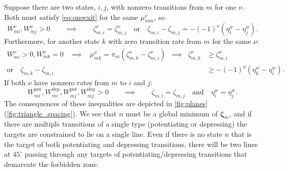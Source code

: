 \documentclass[12pt]{article}
\newcommand{\eqm}{\pi}
\newcommand{\etwm}{\eta^w}
\newcommand{\dgnm}{\zeta}
\newcommand{\dgn}{\boldsymbol{\dgnm}}
\newcommand{\Wm}{W}
\newcommand{\kktm}{\mu}
\newcommand{\pot}{^{\text{pot}}}
\newcommand{\dep}{^{\text{dep}}}
\begin{document}
Suppose there are two states, \(i,j\), with nonzero transitions from \(m\) for one \(\nu\).
Both must satisfy \cref{eq:oneexit} for the same \(\kktm^\nu_{mm}\), so
%
\begin{equation}\label{eq:twoexits}
  \Wm^\nu_{mi}, \Wm^\nu_{mj} > 0
  \qquad \implies \qquad
  \dgnm^\nu_{m,i} = \dgnm^\nu_{m,j}
  \quad \text{or}\quad
  \dgnm_{m,i} - \dgnm_{m,j} = - (-1)^\nu (\etwm_i - \etwm_j).
\end{equation}
%
Furthermore, for another state \(k\) with zero transition rate from \(m\) for the same \(\nu\):
%
\begin{equation}\label{eq:nonexit}
\begin{aligned}
  \Wm^\nu_{mi} > 0, \Wm^\nu_{mk} = 0 
  \;\;\; \implies \;\;\;
  \kktm^\nu_{mk} = \eqm_m (\dgnm^\nu_{m,k} - \dgnm^\nu_{m,i})
  \;\; \implies \;\;
  \dgnm^\nu_{m,k} &\geq \dgnm^\nu_{m,i} \\
  \text{or}\quad
  \dgnm_{m,k} - \dgnm_{m,i} &\geq - (-1)^\nu (\etwm_k - \etwm_i).
\end{aligned}
\end{equation}
%
If both \(\nu\) have nonzero rates from \(m\) to \(i\) and \(j\):
%
\begin{equation}\label{eq:twodoubleexits}
  \Wm\pot_{mi}, \Wm\dep_{mi}, \Wm\pot_{mj}, \Wm\dep_{mj} > 0
  \qquad \implies \qquad
  \dgnm_{m,i} = \dgnm_{m,j} 
  \quad \text{and} \quad
  \etwm_i = \etwm_j.
\end{equation}
%
The consequences of these inequalities are depicted in \cref{fig:planes}(\ref{fig:triangle_spacing}).
We see that \(n\) must be a global minimum of \(\dgn_m\), and if there are multiple transitions of a single type (potentiating or depressing) the targets are constrained to lie on a single line.
Even if there is no state \(n\) that is the target of both potentiating and depressing transitions, there will be two lines at \(45^\circ \) passing through any targets of potentiating/depressing transitions that demarcate the forbidden zone.
\end{document}

